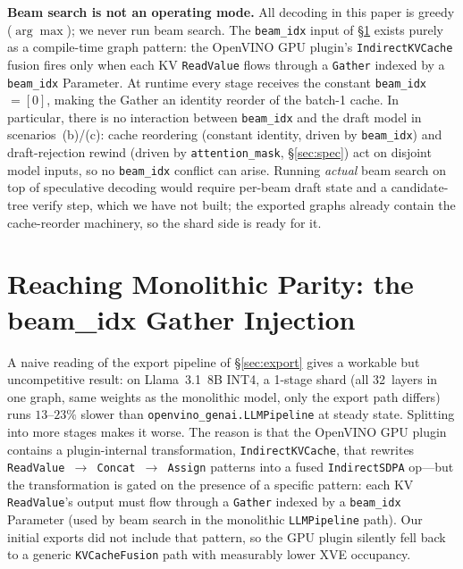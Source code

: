 \documentclass[11pt]{article}
\newcommand{\brk}{\discretionary{}{}{}}
\begin{document}
\textbf{Beam search is not an operating mode.} All decoding in this paper is greedy ($\arg\max$); we never run beam search. The \texttt{beam\_idx} input of \S\ref{sec:shards} exists purely as a compile-time graph pattern: the OpenVINO GPU plugin's \texttt{Indirect\brk KVCache} fusion fires only when each KV \texttt{ReadValue} flows through a \texttt{Gather} indexed by a \texttt{beam\_idx} Parameter. At runtime every stage receives the constant \texttt{beam\_idx}~$=[0]$, making the Gather an identity reorder of the batch-1 cache. In particular, there is no interaction between \texttt{beam\_idx} and the draft model in scenarios~(b)/(c): cache reordering (constant identity, driven by \texttt{beam\_idx}) and draft-rejection rewind (driven by \texttt{attention\_\brk mask}, \S\ref{sec:spec}) act on disjoint model inputs, so no \texttt{beam\_idx} conflict can arise. Running \emph{actual} beam search on top of speculative decoding would require per-beam draft state and a candidate-tree verify step, which we have not built; the exported graphs already contain the cache-reorder machinery, so the shard side is ready for it.

\section{Reaching Monolithic Parity: the beam\_idx Gather Injection}
\label{sec:shards}

A naive reading of the export pipeline of \S\ref{sec:export} gives a workable but uncompetitive result: on Llama~3.1~8B INT4, a 1-stage shard (all 32~layers in one graph, same weights as the monolithic model, only the export path differs) runs $13$--$23\%$ slower than \texttt{openvino\_genai.LLMPipeline} at steady state. Splitting into more stages makes it worse. The reason is that the OpenVINO GPU plugin contains a plugin-internal transformation, \texttt{Indirect\brk KVCache}, that rewrites \texttt{ReadValue $\rightarrow$ Concat $\rightarrow$ Assign} patterns into a fused \texttt{IndirectSDPA} op---but the transformation is gated on the presence of a specific pattern: each KV \texttt{ReadValue}'s output must flow through a \texttt{Gather} indexed by a \texttt{beam\_idx} Parameter (used by beam search in the monolithic \texttt{LLMPipeline} path). Our initial exports did not include that pattern, so the GPU plugin silently fell back to a generic \texttt{KVCache\brk Fusion} path with measurably lower XVE occupancy.
\end{document}
